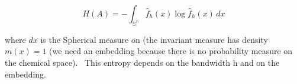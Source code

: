 \[ H(A) = -\int_\mathbb{{S}^n}  \hat{f}_h(x)\log  \hat{f}_h(x) \,dx  \]



where $dx$ is the Spherical measure on  (the invariant measure has density $m(x)=1$ (we need an embedding because there is no probability measure on the chemical space). 
This entropy depends on the bandwidth h and on the embedding.

